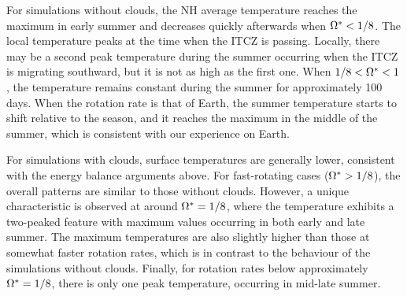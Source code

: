 For simulations without clouds, the NH average temperature reaches the maximum in early summer and decreases quickly afterwards when $\Omega^*<1/8$. The local temperature peaks at the time when the ITCZ is passing. Locally, there may be a second peak temperature during the summer occurring when the ITCZ is migrating southward, but it is not as high as the first one. When $1/8<\Omega^*<1$, the temperature remains constant during the summer for approximately 100 days. When the rotation rate is that of Earth, the summer temperature starts to shift relative to the season, and it reaches the maximum in the middle of the summer, which is consistent with our experience on Earth.

For simulations with clouds, surface temperatures are generally lower, consistent with the energy balance arguments above. For fast-rotating cases ($\Omega^*>1/8$), the overall patterns are similar to those without clouds. However, a unique characteristic is observed at around $\Omega^* = 1/8$, where the temperature exhibits a two-peaked feature with maximum values occurring in both early and late summer. The maximum temperatures are also slightly higher than those at somewhat faster rotation rates, which is in contrast to the behaviour of the simulations without clouds. Finally, for rotation rates below approximately $\Omega^* = 1/8 $, there is only one peak temperature, occurring in mid-late summer.

